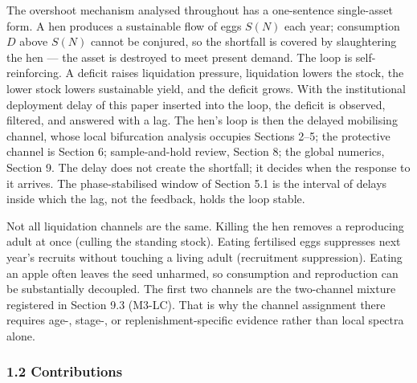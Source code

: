 \documentclass[11pt]{article}
\begin{document}
The overshoot mechanism analysed throughout has a one-sentence
single-asset form. A hen produces a sustainable flow of eggs \(S(N)\)
each year; consumption \(D\) above \(S(N)\) cannot be conjured, so the
shortfall is covered by slaughtering the hen --- the asset is destroyed
to meet present demand. The loop is self-reinforcing. A deficit raises
liquidation pressure, liquidation lowers the stock, the lower stock
lowers sustainable yield, and the deficit grows. With the institutional
deployment delay of this paper inserted into the loop, the deficit is
observed, filtered, and answered with a lag. The hen's loop is then the
delayed mobilising channel, whose local bifurcation analysis occupies
Sections 2--5; the protective channel is Section 6; sample-and-hold
review, Section 8; the global numerics, Section 9. The delay does not
create the shortfall; it decides when the response to it arrives. The
phase-stabilised window of Section 5.1 is the interval of delays inside
which the lag, not the feedback, holds the loop stable.

Not all liquidation channels are the same. Killing the hen removes a
reproducing adult at once (culling the standing stock). Eating
fertilised eggs suppresses next year's recruits without touching a
living adult (recruitment suppression). Eating an apple often leaves the
seed unharmed, so consumption and reproduction can be substantially
decoupled. The first two channels are the two-channel mixture registered
in Section 9.3 (M3-LC). That is why the channel assignment there
requires age-, stage-, or replenishment-specific evidence rather than
local spectra alone.

\subsubsection{1.2 Contributions}\label{contributions}
\end{document}
